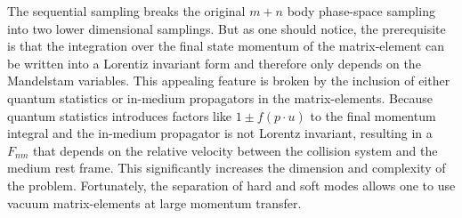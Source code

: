 The sequential sampling breaks the original $m+n$ body phase-space sampling into two lower dimensional samplings.
But as one should notice, the prerequisite is that the integration over the final state momentum of the matrix-element can be written into a Lorentiz invariant form and therefore only depends on the Mandelstam variables.
This appealing feature is broken by the inclusion of either
quantum statistics or in-medium propagators in the matrix-elements. 
Because quantum statistics introduces factors like $1\pm f(p\cdot u)$ to the final momentum integral and the in-medium propagator is not Lorentz invariant, resulting in a $F_{nm}$ that depends on the relative velocity between the collision system and the medium rest frame.
This significantly increases the dimension and complexity of the problem. 
Fortunately, the separation of hard and soft modes allows one to use vacuum matrix-elements at large momentum transfer. 

